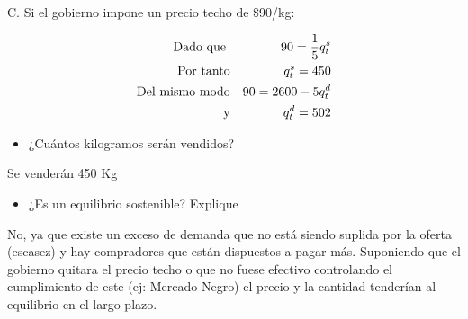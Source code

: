 \documentclass[12pt,dvipsnames]{article}
\begin{document}
C.	Si el gobierno impone un precio techo de \$90/kg:

\begin{minipage}{.5\textwidth}
\centering
{}
\end{minipage}%
\begin{minipage}{.5\textwidth}
\centering
\begin{eqnarray*}
\textnormal{Dado que } & & 90=\frac{1}{5} q^s_t\\
\textnormal{Por tanto} & &  q^s_t = 450\\
\textnormal{Del mismo modo} & & 90=2600-5q^d_t\\
\textnormal{y} & & q^d_t = 502\\
\end{eqnarray*}
\end{minipage}%

\begin{itemize}
	\item ¿Cuántos kilogramos serán vendidos?
\end{itemize}

Se venderán 450 Kg

\begin{itemize}
\item ¿Es un equilibrio sostenible? Explique
\end{itemize}

No, ya que existe un exceso de demanda que no está siendo suplida por la oferta (escasez) y hay compradores que están dispuestos a pagar más. Suponiendo que el gobierno quitara el precio techo o que no fuese efectivo controlando el cumplimiento de este (ej: Mercado Negro) el precio y la cantidad tenderían al equilibrio en el largo plazo.\\
\end{document}
